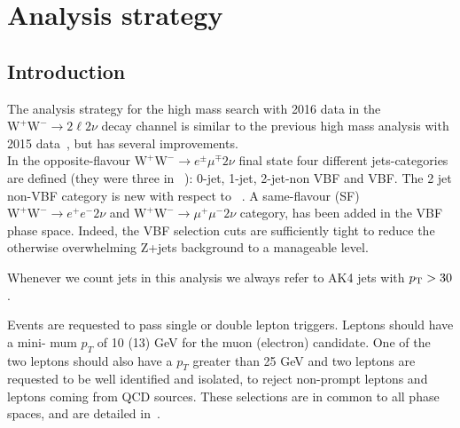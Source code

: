 \section{Analysis strategy}\label{sec:AnalysisStrategy}

\subsection{Introduction}
The analysis strategy for the high mass search with 2016 data in the
$\mathrm{W^+W^-}\to2\ell2\nu$ decay channel  is similar to the previous high
mass analysis with 2015 data~\cite{CMS-PAS-HIG-16-023}, but has several improvements. \\
In the opposite-flavour $\mathrm{W^+W^-}\to e^{\pm} \mu^{\mp} 2\nu$ final
state four different jets-categories are defined (they were three in
~\cite{CMS-PAS-HIG-16-023}): 0-jet, 1-jet, 2-jet-non VBF and VBF. The 2 jet
non-VBF category is new with respect to ~\cite{CMS-PAS-HIG-16-023}.
A same-flavour (SF) $\mathrm{W^+W^-}\to e^+ e^- 2\nu$ and $\mathrm{W^+W^-}\to
\mu^+ \mu^- 2\nu$ category, has been added in the VBF phase space. Indeed, the VBF
selection cuts are sufficiently tight to reduce the otherwise overwhelming
Z+jets background to a manageable level.

Whenever we count jets in this analysis we always refer to AK4 jets with $p_{\mathrm{T}}>30$\GeV.

Events are requested to pass single or double lepton triggers. Leptons should have a mini-
mum $p_T$ of 10 (13) GeV for the muon (electron) candidate. One of the two leptons should also
have a $p_T$ greater than 25 GeV and two leptons are requested to be well identified and isolated,
to reject non-prompt leptons and leptons coming from QCD sources. These selections are in
common to all phase spaces, and are detailed in~\cite{AN-17-082}.


